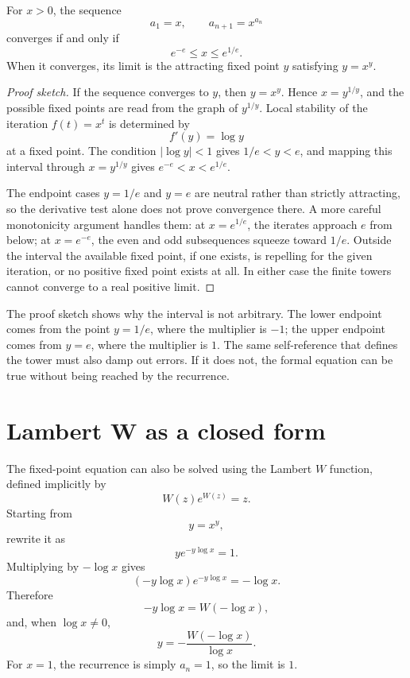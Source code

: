 \documentclass{essay}
\begin{document}
\begin{theorem}
  For \(x>0\), the sequence
  \[
    a_1=x,\qquad a_{n+1}=x^{a_n}
  \]
  converges if and only if
  \[
    e^{-e}\le x\le e^{1/e}.
  \]
  When it converges, its limit is the attracting fixed point \(y\) satisfying
  \(y=x^y\).
\end{theorem}

\begin{proof}[Proof sketch]
  If the sequence converges to \(y\), then \(y=x^y\). Hence
  \(x=y^{1/y}\), and the possible fixed points are read from the graph of
  \(y^{1/y}\). Local stability of the iteration \(f(t)=x^t\) is determined by
  \[
    f'(y)=\log y
  \]
  at a fixed point. The condition \(|\log y|<1\) gives
  \(1/e<y<e\), and mapping this interval through \(x=y^{1/y}\) gives
  \(e^{-e}<x<e^{1/e}\).

  The endpoint cases \(y=1/e\) and \(y=e\) are neutral rather than strictly
  attracting, so the derivative test alone does not prove convergence there.
  A more careful monotonicity argument handles them: at \(x=e^{1/e}\), the
  iterates approach \(e\) from below; at \(x=e^{-e}\), the even and odd
  subsequences squeeze toward \(1/e\). Outside the interval the available fixed
  point, if one exists, is repelling for the given iteration, or no positive
  fixed point exists at all. In either case the finite towers cannot converge
  to a real positive limit.
\end{proof}

The proof sketch shows why the interval is not arbitrary. The lower endpoint
comes from the point \(y=1/e\), where the multiplier is \(-1\); the upper
endpoint comes from \(y=e\), where the multiplier is \(1\). The same
self-reference that defines the tower must also damp out errors. If it does
not, the formal equation can be true without being reached by the recurrence.

\section{Lambert W as a closed form}

The fixed-point equation can also be solved using the Lambert \(W\) function,
defined implicitly by
\[
  W(z)e^{W(z)}=z.
\]
Starting from
\[
  y=x^y,
\]
rewrite it as
\[
  y e^{-y\log x}=1.
\]
Multiplying by \(-\log x\) gives
\[
  (-y\log x)e^{-y\log x}=-\log x.
\]
Therefore
\[
  -y\log x=W(-\log x),
\]
and, when \(\log x\ne0\),
\[
  y=-\frac{W(-\log x)}{\log x}.
\]
For \(x=1\), the recurrence is simply \(a_n=1\), so the limit is \(1\).
\end{document}
